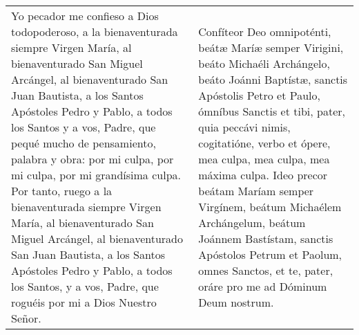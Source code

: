 \documentclass[./devocionario.tex]{subfiles}
\begin{document}
    \begin{longtable} { p{} p{} }
        Yo pecador me confieso a Dios todopoderoso, a la bienaventurada siempre Virgen María, al bienaventurado San Miguel Arcángel, 
        al bienaventurado San Juan Bautista, a los Santos Apóstoles Pedro y Pablo, a todos los Santos y a vos, Padre, que pequé mucho 
        de pensamiento, palabra y obra: por mi culpa, por mi culpa, por mi grandísima culpa. Por tanto, ruego a la bienaventurada 
        siempre Virgen María, al bienaventurado San Miguel Arcángel, al bienaventurado San Juan Bautista, a los Santos Apóstoles 
        Pedro y Pablo, a todos los Santos, y a vos, Padre, que roguéis por mi a Dios Nuestro Señor. &
        Confíteor Deo omnipoténti, beátæ Maríæ semper Virigini, beáto Michaéli Archángelo, beáto Joánni Baptístæ, sanctis Apóstolis Petro et Paulo, 
        ómníbus Sanctis et tibi, pater, quia peccávi nimis, cogitatióne, verbo et ópere, mea culpa, mea culpa, mea máxima culpa. Ideo precor beátam 
        Maríam semper Virgínem, beátum Michaélem Archángelum, beátum Joánnem Bastístam, sanctis Apóstolos Petrum et Paolum, omnes Sanctos, et te, pater, 
        oráre pro me ad Dóminum Deum nostrum.\\
    \end{longtable}
\end{document}
